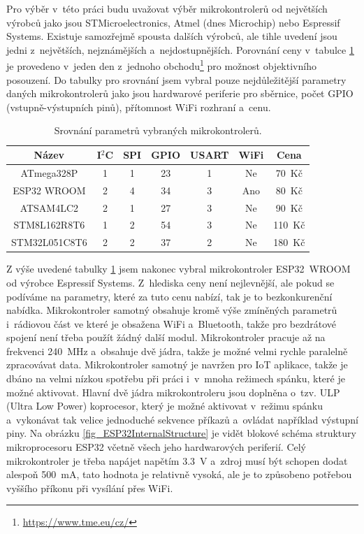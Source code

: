 Pro výběr v~této práci budu uvažovat výběr mikrokontrolerů od největších výrobců jako jsou STMicroelectronics, Atmel (dnes Microchip) nebo Espressif Systems. Existuje samozřejmě spousta dalších výrobců, ale tihle uvedení jsou jedni z~největších, nejznámějších a~nejdostupnějších. Porovnání ceny v~tabulce \ref{tab_MCU} je provedeno v~jeden den z~jednoho obchodu\footnote{\url{https://www.tme.eu/cz/}} pro možnost objektivního posouzení. Do tabulky pro srovnání jsem vybral pouze nejdůležitější parametry daných mikrokontrolerů jako jsou hardwarové periferie pro sběrnice, počet GPIO (vstupně-výstupních pinů), přítomnost WiFi rozhraní a~cenu.

\begin{table}[h]
    \caption{Srovnání parametrů vybraných mikrokontrolerů.}
    \centering
    \begin{tabular}{c|cccccc}
        \textbf{Název}                         & \textbf{I$^2$C} & \textbf{SPI} & \textbf{GPIO} & \textbf{USART} & \textbf{WiFi} & \textbf{Cena} \\ \hline
        ATmega328P \cite{dat_ATmega328p}       & 1 & 1 & 23 & 1 & Ne  & 70~Kč \\
        ESP32 WROOM \cite{dat_ESP32-WROOM}     & 2 & 4 & 34 & 3 & Ano & 80~Kč \\
        ATSAM4LC2 \cite{dat_ATSAM4LC2}         & 2 & 1 & 27 & 3 & Ne  & 90~Kč \\
        STM8L162R8T6 \cite{dat_STM8L162R8T6}   & 1 & 2 & 54 & 3 & Ne  & 110~Kč \\
        STM32L051C8T6 \cite{dat_STM32L051C8T6} & 2 & 2 & 37 & 2 & Ne  & 180~Kč
        
    \end{tabular}
    \label{tab_MCU}
\end{table}

Z výše uvedené tabulky \ref{tab_MCU} jsem nakonec vybral mikrokontroler ESP32~WROOM od výrobce Espressif Systems. Z~hlediska ceny není nejlevnější, ale pokud se podíváme na parametry, které za tuto cenu nabízí, tak je to bezkonkurenční nabídka. Mikrokontroler samotný obsahuje kromě výše zmíněných parametrů i~rádiovou část ve které je obsažena WiFi a~Bluetooth, takže pro bezdrátové spojení není třeba použít žádný další modul. Mikrokontroler pracuje až na frekvenci \SI{240}{\mega\hertz} a~obsahuje dvě jádra, takže je možné velmi rychle paralelně zpracovávat data. Mikrokontroler samotný je navržen pro IoT aplikace, takže je dbáno na velmi nízkou spotřebu při práci i~v~mnoha režimech spánku, které je možné aktivovat. Hlavní dvě jádra mikrokontroleru jsou doplněna o~tzv. ULP (Ultra Low Power) koprocesor, který je možné aktivovat v~režimu spánku a~vykonávat tak velice jednoduché sekvence příkazů a~ovládat například výstupní piny. Na obrázku \ref{fig_ESP32InternalStructure} je vidět blokové schéma struktury mikroprocesoru ESP32 včetně všech jeho hardwarových periferií. Celý mikrokontroler je třeba napájet napětím \SI{3,3}{\volt} a~zdroj musí být schopen dodat alespoň \SI{500}{\milli\ampere}, tato hodnota je relativně vysoká, ale je to způsobeno potřebou vyššího příkonu při vysílání přes WiFi.

